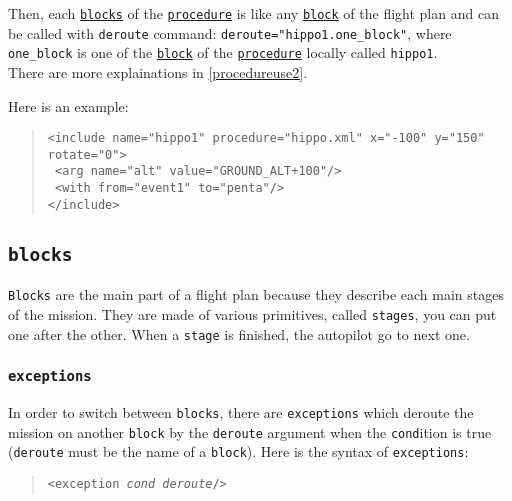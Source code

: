 \documentclass{article}
\renewcommand{\tt}[1]{\texttt{#1}}
\newcommand{\ex}[1]{\colorbox[gray]{0.92}{\tt{#1}}}
\newcommand{\hs}[1]{\hspace*{#1cm}}
\newcommand{\qt}[1]{\textcolor{gris75}{#1}}
\begin{document}
Then, each \hyperlink{blocks}{\tt{blocks}} of the
\hyperlink{procedures}{\tt{procedure}}
is like any \hyperlink{blocks}{\tt{block}} of the flight plan and can be called
with \tt{deroute} command: \ex{deroute="\qt{hippo1.one\_block}"}, where
\tt{one\_block} is one of the \hyperlink{blocks}{\tt{block}} of the
\hyperlink{procedures}{\tt{procedure}} locally called \tt{hippo1}. \\
There are more explainations in \autoref{procedureuse2}. \\


\begin{minipage}[ctb]{\textwidth}
Here is an example:
\begin{quote}
	\ex{<include name="\qt{hippo1}" procedure="\qt{hippo.xml}" x="\qt{-100}" y="\qt{150}" rotate="\qt{0}">} \\
	\ex{\hs{0.5} <arg name="\qt{alt}" value="\qt{GROUND\_ALT+100}"/>} \\
	\ex{\hs{0.5} <with from="\qt{event1}" to="\qt{penta}"/>} \\
	\ex{</include>}
\end{quote}
\end{minipage}


\hypertarget{blocks}{\subsection{\tt{blocks}}}
\tt{Blocks} are the main part of a flight plan because they describe each 
main stages of the mission. They are made of various primitives, called
\tt{stages}, you can put one after the other. When a \tt{stage} is finished,
the autopilot go to next one.


\hypertarget{exceptions}{\subsubsection{\tt{exceptions}}}
In order to switch between
\tt{blocks}, there are \tt{exceptions} which deroute the mission
on another \tt{block} by the \tt{deroute} argument when the
\tt{cond}ition is true (\tt{deroute} must be the name of
a \tt{block}). Here is the syntax of \tt{exceptions}:

\begin{quote}
	\tt{<exception \emph{cond deroute}/>}
\end{quote}
\end{document}
